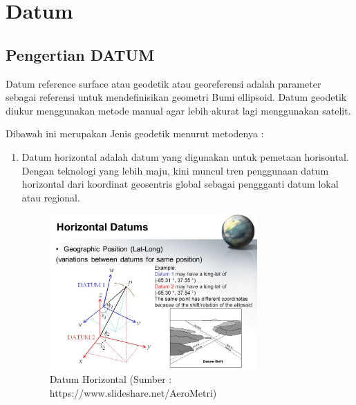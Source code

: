 \section{Datum}
\subsection{Pengertian DATUM}

Datum reference surface atau geodetik atau georeferensi adalah parameter sebagai referensi untuk mendefinisikan geometri Bumi ellipsoid. Datum geodetik diukur menggunakan metode manual agar lebih akurat lagi menggunakan satelit.

Dibawah ini merupakan Jenis geodetik menurut metodenya :
\begin{enumerate}
\item Datum horizontal adalah datum yang digunakan untuk pemetaan horisontal. Dengan teknologi yang lebih maju, kini muncul tren penggunaan datum horizontal dari koordinat geosentris global sebagai penggganti datum lokal atau regional.
\begin{figure}[htbp]
		\centering
		\includegraphics[width=0.75\textwidth]{pictures/datum_horizontal.jpg}
		\caption{Datum Horizontal (Sumber : https://www.slideshare.net/AeroMetri)}
		\label{Datum Horizontal}
		\end{figure}	


\end{enumerate}
